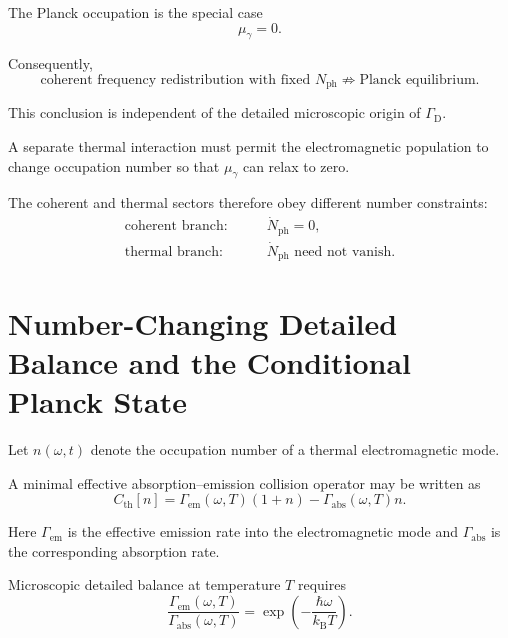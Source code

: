 The Planck occupation is the special case
\begin{equation}
    \mu_\gamma
    =
    0.
    \label{eq:AT_zero_mu}
\end{equation}

Consequently,
\begin{equation}
    \text{coherent frequency redistribution with fixed }
    N_{\mathrm{ph}}
    \not\Rightarrow
    \text{Planck equilibrium}.
    \label{eq:AT_number_conservation_no_Planck}
\end{equation}

This conclusion is independent of the detailed microscopic origin of
\(\Gamma_{\mathrm D}\).

A separate thermal interaction must permit the electromagnetic population to
change occupation number so that
\(\mu_\gamma\)
can relax to zero.

The coherent and thermal sectors therefore obey different number
constraints:
\begin{equation}
    \begin{aligned}
        \text{coherent branch:}
        &\qquad
        \dot N_{\mathrm{ph}}=0,
        \\
        \text{thermal branch:}
        &\qquad
        \dot N_{\mathrm{ph}}
        \text{ need not vanish}.
    \end{aligned}
    \label{eq:AT_number_sector_distinction}
\end{equation}


\section{Number-Changing Detailed Balance and the Conditional Planck State}

Let
\(n(\omega,t)\)
denote the occupation number of a thermal electromagnetic mode.

A minimal effective absorption--emission collision operator may be written
as
\begin{equation}
    C_{\mathrm{th}}[n]
    =
    \Gamma_{\mathrm{em}}(\omega,T)
    \left(
        1+n
    \right)
    -
    \Gamma_{\mathrm{abs}}(\omega,T)
    n.
    \label{eq:AT_collision_operator}
\end{equation}

Here
\(\Gamma_{\mathrm{em}}\)
is the effective emission rate into the electromagnetic mode and
\(\Gamma_{\mathrm{abs}}\)
is the corresponding absorption rate.

Microscopic detailed balance at temperature \(T\) requires
\begin{equation}
    \frac{
        \Gamma_{\mathrm{em}}(\omega,T)
    }{
        \Gamma_{\mathrm{abs}}(\omega,T)
    }
    =
    \exp
    \left(
        -
        \frac{
            \hbar\omega
        }{
            k_{\mathrm B}T
        }
    \right).
    \label{eq:AT_detailed_balance}
\end{equation}


